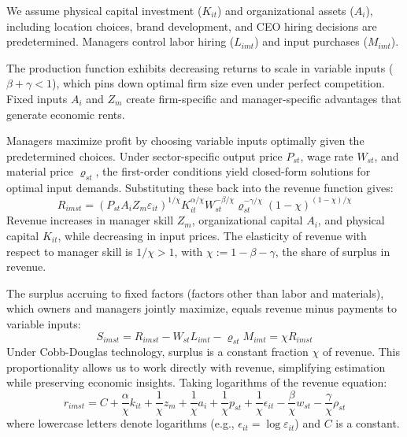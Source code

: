 \documentclass[11pt,a4paper]{article}
\begin{document}
We assume physical capital investment ($K_{it}$) and organizational assets ($A_i$), including location choices, brand development, and CEO hiring decisions are predetermined. Managers control labor hiring ($L_{imt}$) and input purchases ($M_{imt}$). 

The production function exhibits decreasing returns to scale in variable inputs ($\beta + \gamma < 1$), which pins down optimal firm size even under perfect competition. Fixed inputs $A_i$ and $Z_m$ create firm-specific and manager-specific advantages that generate economic rents.

Managers maximize profit by choosing variable inputs optimally given the predetermined choices. Under sector-specific output price $P_{st}$, wage rate $W_{st}$, and material price $\varrho_{st}$, the first-order conditions yield closed-form solutions for optimal input demands. Substituting these back into the revenue function gives:
\begin{equation}\label{eq:revenue}
R_{imst} = (P_{st}A_i Z_m \varepsilon_{it})^{1/\chi}
K_{it}^{\alpha/\chi}
W_{st}^{-\beta/\chi}
\varrho_{st}^{-\gamma/\chi}
(1-\chi)^{(1-\chi)/\chi}
\end{equation}
Revenue increases in manager skill $Z_m$, organizational capital $A_i$, and physical capital $K_{it}$, while decreasing in input prices. The elasticity of revenue with respect to manager skill is $1/\chi > 1$, with $\chi := 1 - \beta - \gamma$, the share of surplus in revenue. 

The surplus accruing to fixed factors (factors other than labor and materials), which owners and managers jointly maximize, equals revenue minus payments to variable inputs:
\begin{equation}\label{eq:surplus}
S_{imst} = R_{imst} - W_{st}L_{imt} - \varrho_{st}M_{imt} = \chi R_{imst}
\end{equation}
Under Cobb-Douglas technology, surplus is a constant fraction $\chi$ of revenue. This proportionality allows us to work directly with revenue, simplifying estimation while preserving economic insights. Taking logarithms of the revenue equation:
\begin{equation}\label{eq:log_revenue}
r_{imst} = C+\frac{\alpha}{\chi} k_{it} + \frac{1}{\chi} z_{m} + \frac{1}{\chi} a_i + \frac{1}{\chi} p_{st} + \frac{1}{\chi}\epsilon_{it} 
- \frac{\beta}{\chi} w_{st} - \frac{\gamma}{\chi} \rho_{st}
\end{equation}
where lowercase letters denote logarithms (e.g., $\epsilon_{it} = \log \varepsilon_{it}$) and $C$ is a constant.
\end{document}
